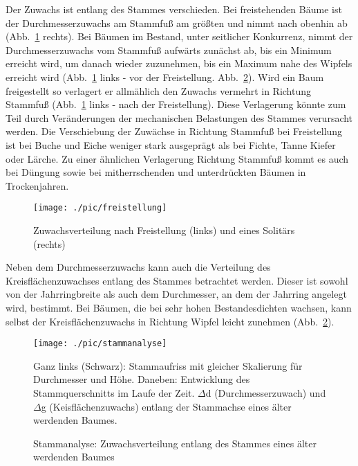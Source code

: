 \documentclass[twocolumn]{scrartcl}
\begin{document}
Der Zuwachs ist entlang des Stammes verschieden. Bei freistehenden Bäume ist der
Durchmesserzuwachs am Stammfuß am größten und nimmt nach obenhin ab
(Abb.~\ref{fig:freistellung} rechts). Bei Bäumen im Bestand, unter seitlicher
Konkurrenz, nimmt der Durchmesserzuwachs vom Stammfuß aufwärts zunächst ab, bis
ein Minimum erreicht wird, um danach wieder zuzunehmen, bis ein Maximum nahe des
Wipfels erreicht wird (Abb.~\ref{fig:freistellung} links - vor der Freistellung.
Abb.~\ref{fig:stammanalyse}). Wird ein Baum freigestellt so verlagert er
allmählich den Zuwachs vermehrt in Richtung Stammfuß
(Abb.~\ref{fig:freistellung} links - nach der Freistellung). Diese Verlagerung
könnte zum Teil durch Veränderungen der mechanischen Belastungen des Stammes
verursacht werden. Die Verschiebung der Zuwächse in Richtung Stammfuß bei
Freistellung ist bei Buche und Eiche weniger stark ausgeprägt als bei Fichte,
Tanne Kiefer oder Lärche. Zu einer ähnlichen Verlagerung Richtung Stammfuß kommt
es auch bei Düngung sowie bei mitherrschenden und unterdrückten Bäumen in
Trockenjahren.

\begin{figure}[htbp]
  \centering
  \texttt{[image: ./pic/freistellung]}
  \caption{Zuwachsverteilung nach Freistellung (links) und eines Solitärs (rechts)}
  \label{fig:freistellung}
\end{figure}

Neben dem Durchmesserzuwachs kann auch die Verteilung des Kreisflächenzuwachses
entlang des Stammes betrachtet werden. Dieser ist sowohl von der Jahrringbreite
als auch dem Durchmesser, an dem der Jahrring angelegt wird, bestimmt. Bei
Bäumen, die bei sehr hohen Bestandesdichten wachsen, kann selbst der
Kreisflächenzuwachs in Richtung Wipfel leicht zunehmen
(Abb.~\ref{fig:stammanalyse}).

\begin{figure}[htbp]
  \centering
  \texttt{[image: ./pic/stammanalyse]}
  \caption{Stammanalyse: Zuwachsverteilung entlang des Stammes eines älter
  werdenden Baumes}
  \footnotesize{Ganz links (Schwarz): Stammaufriss mit gleicher Skalierung für Durchmesser und Höhe. Daneben: Entwicklung des Stammquerschnitts im Laufe der Zeit. $\Delta$d (Durchmesserzuwach) und $\Delta$g (Keisflächenzuwachs) entlang der Stammachse eines älter werdenden Baumes.}
  \label{fig:stammanalyse}
\end{figure}
\end{document}
